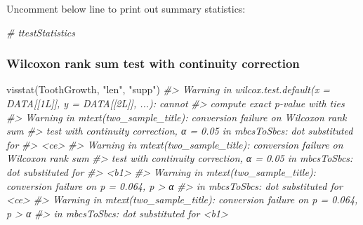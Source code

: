 \documentclass[
]{article}
\newenvironment{Shaded}{\begin{snugshade}}{\end{snugshade}}
\newcommand{\CommentTok}[1]{\textcolor[rgb]{0.56,0.35,0.01}{\textit{#1}}}
\newcommand{\FunctionTok}[1]{\textcolor[rgb]{0.00,0.00,0.00}{#1}}
\newcommand{\NormalTok}[1]{#1}
\newcommand{\StringTok}[1]{\textcolor[rgb]{0.31,0.60,0.02}{#1}}
\begin{document}
Uncomment below line to print out summary statistics:

\begin{Shaded}
\begin{Highlighting}[]
\CommentTok{\# ttestStatistics}
\end{Highlighting}
\end{Shaded}

\hypertarget{wilcoxon-rank-sum-test-with-continuity-correction}{%
\subsubsection{Wilcoxon rank sum test with continuity
correction}\label{wilcoxon-rank-sum-test-with-continuity-correction}}

\begin{Shaded}
\begin{Highlighting}[]
\FunctionTok{visstat}\NormalTok{(ToothGrowth, }\StringTok{"len"}\NormalTok{, }\StringTok{"supp"}\NormalTok{)}
\CommentTok{\#\textgreater{} Warning in wilcox.test.default(x = DATA[[1L]], y = DATA[[2L]], ...): cannot}
\CommentTok{\#\textgreater{} compute exact p{-}value with ties}
\CommentTok{\#\textgreater{} Warning in mtext(two\_sample\_title): conversion failure on \textquotesingle{}Wilcoxon rank sum}
\CommentTok{\#\textgreater{} test with continuity correction, α = 0.05\textquotesingle{} in \textquotesingle{}mbcsToSbcs\textquotesingle{}: dot substituted for}
\CommentTok{\#\textgreater{} \textless{}ce\textgreater{}}
\CommentTok{\#\textgreater{} Warning in mtext(two\_sample\_title): conversion failure on \textquotesingle{}Wilcoxon rank sum}
\CommentTok{\#\textgreater{} test with continuity correction, α = 0.05\textquotesingle{} in \textquotesingle{}mbcsToSbcs\textquotesingle{}: dot substituted for}
\CommentTok{\#\textgreater{} \textless{}b1\textgreater{}}
\CommentTok{\#\textgreater{} Warning in mtext(two\_sample\_title): conversion failure on \textquotesingle{} p = 0.064, p \textgreater{} α\textquotesingle{}}
\CommentTok{\#\textgreater{} in \textquotesingle{}mbcsToSbcs\textquotesingle{}: dot substituted for \textless{}ce\textgreater{}}
\CommentTok{\#\textgreater{} Warning in mtext(two\_sample\_title): conversion failure on \textquotesingle{} p = 0.064, p \textgreater{} α\textquotesingle{}}
\CommentTok{\#\textgreater{} in \textquotesingle{}mbcsToSbcs\textquotesingle{}: dot substituted for \textless{}b1\textgreater{}}
\end{Highlighting}
\end{Shaded}
\end{document}
